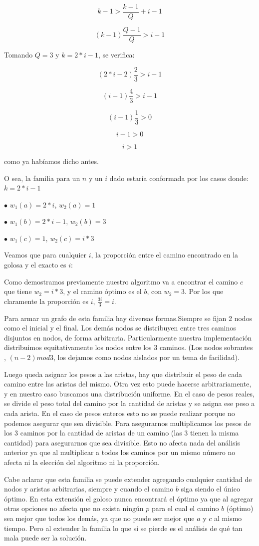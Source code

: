 $$k-1 > \frac{k-1}{Q}+i-1$$

$$(k-1) \frac{Q-1}{Q} > i-1$$

Tomando $Q=3$ y $k=2*i-1$, se verifica:

$$(2*i-2) \frac{2}{3} > i-1$$

$$(i-1) \frac{4}{3} > i-1$$

$$(i-1) \frac{1}{3} > 0$$

$$i-1 > 0$$

$$i > 1$$

como ya habíamos dicho antes.


O sea, la familia para un $n$ y un $i$ dado estaría conformada por los casos donde: $k = 2*i-1$

$\bullet$ $w_1(a) = 2*i$, $w_2(a)=1$

$\bullet$ $w_1(b) = 2*i-1$, $w_2(b)=3$

$\bullet$ $w_1(c) = 1$, $w_2(c)=i*3$

Veamos que para cualquier $i$, la proporción entre el camino encontrado en la golosa y el exacto es $i$:

Como demostramos previamente nuestro algoritmo va a encontrar el camino $c$ que tiene $w_2=i*3$, y el camino óptimo es el $b$, con $w_2=3$. Por los que claramente la proporción es $i$, $\frac{3i}{3}=i$.

Para armar un grafo de esta familia hay diversas formas.Siempre se fijan 2 nodos como el inicial y el final. Los demás nodos se distribuyen entre tres caminos disjuntos en nodos, de forma arbitraria. Particularmente nuestra implementación distribuimos equitativamente los nodos entre los 3 caminos. (Los nodos sobrantes , $(n-2) mod 3$, los dejamos como nodos aislados por un tema de facilidad).

Luego queda asignar los pesos a las aristas, hay que distribuir el peso de cada camino entre las aristas del mismo. Otra vez esto puede hacerse arbitrariamente, y en nuestro caso buscamos una distribución uniforme.
En el caso de pesos reales, se divide el peso total del camino por la cantidad de aristas y se asigna ese peso a cada arista.
En el caso de pesos enteros esto no se puede realizar porque no podemos asegurar que sea divisible. Para asegurarnos multiplicamos los pesos de los 3 caminos por la cantidad de aristas de un camino (las 3 tienen la misma cantidad) para asegurarnos que sea divisible. Esto no afecta nada del análisis anterior ya que al multiplicar a todos los caminos por un mismo número no afecta ni la elección del algoritmo ni la proporción.

Cabe aclarar que esta familia se puede extender agregando cualquier cantidad de nodos y aristas arbitrarias, siempre y cuando el camino $b$ siga siendo el único óptimo. En esta extensión el goloso nunca encontrará el óptimo ya que al agregar otras opciones no afecta que no exista ningún $p$ para el cual el camino $b$ (óptimo) sea mejor que todos los demás, ya que no puede ser mejor que $a$ y $c$ al mismo tiempo. Pero al extender la familia lo que si se pierde es el análisis de	qué tan mala puede ser la solución.  